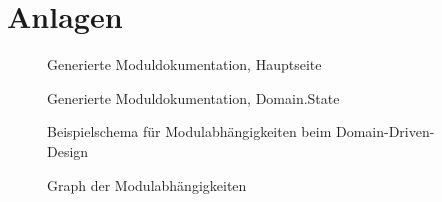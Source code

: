 \section{Anlagen} \label{Anlagen}

\begin{figure}[ht]
    \caption{Generierte Moduldokumentation, Hauptseite}
    \label{module-doc-index}
\end{figure}

\begin{figure}[ht]
    \caption{Generierte Moduldokumentation, Domain.State}
    \label{module-doc-state}
\end{figure}

\begin{figure}[ht]
    \caption{Beispielschema für Modulabhängigkeiten beim Domain-Driven-Design}
    \label{domain-driven-design-layers}
    \centering{}
\end{figure}

\begin{figure}[ht]
    \caption{Graph der Modulabhängigkeiten}
    \label{module-dependency-graph}
    \centering{}
\end{figure}